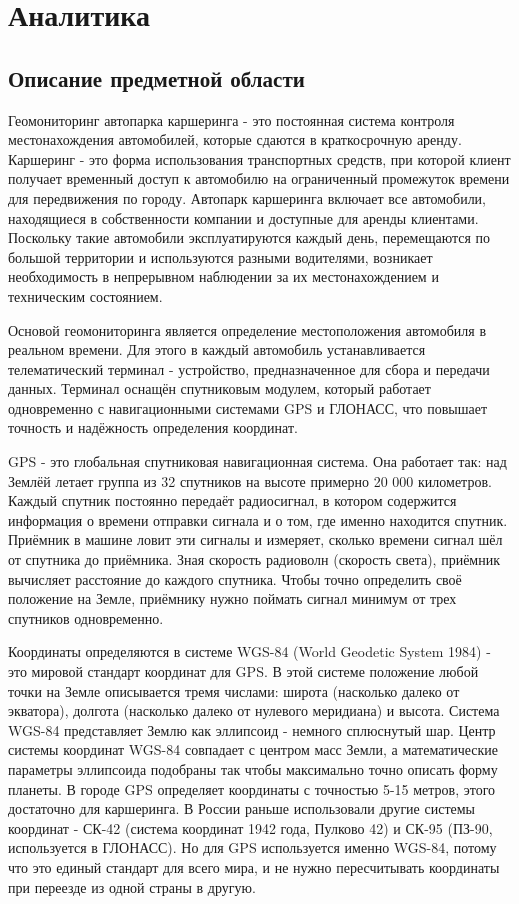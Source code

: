 \section{Аналитика}

\subsection{Описание предметной области}

Геомониторинг автопарка каршеринга - это постоянная система контроля местонахождения автомобилей, которые сдаются в краткосрочную аренду. Каршеринг - это форма использования транспортных средств, при которой клиент получает временный доступ к автомобилю на ограниченный промежуток времени для передвижения по городу. Автопарк каршеринга включает все автомобили, находящиеся в собственности компании и доступные для аренды клиентами. Поскольку такие автомобили эксплуатируются каждый день, перемещаются по большой территории и используются разными водителями, возникает необходимость в непрерывном наблюдении за их местонахождением и техническим состоянием.

Основой геомониторинга является определение местоположения автомобиля в реальном времени. Для этого в каждый автомобиль устанавливается телематический терминал - устройство, предназначенное для сбора и передачи данных. Терминал оснащён спутниковым модулем, который работает одновременно с навигационными системами GPS и ГЛОНАСС, что повышает точность и надёжность определения координат.

GPS - это глобальная спутниковая навигационная система. Она работает так: над Землёй летает группа из 32 спутников на высоте примерно 20 000 километров. Каждый спутник постоянно передаёт радиосигнал, в котором содержится информация о времени отправки сигнала и о том, где именно находится спутник. Приёмник в машине ловит эти сигналы и измеряет, сколько времени сигнал шёл от спутника до приёмника. Зная скорость радиоволн (скорость света), приёмник вычисляет расстояние до каждого спутника. Чтобы точно определить своё положение на Земле, приёмнику нужно поймать сигнал минимум от трех спутников одновременно.

Координаты определяются в системе WGS-84 (World Geodetic System 1984) - это мировой стандарт координат для GPS. В этой системе положение любой точки на Земле описывается тремя числами: широта (насколько далеко от экватора), долгота (насколько далеко от нулевого меридиана) и высота. Система WGS-84 представляет Землю как эллипсоид - немного сплюснутый шар. Центр системы координат WGS-84 совпадает с центром масс Земли, а математические параметры эллипсоида подобраны так чтобы максимально точно описать форму планеты. В городе GPS определяет координаты с точностью 5-15 метров, этого достаточно для каршеринга. В России раньше использовали другие системы координат - СК-42 (система координат 1942 года, Пулково 42) и СК-95 (ПЗ-90, используется в ГЛОНАСС). Но для GPS используется именно WGS-84, потому что это единый стандарт для всего мира, и не нужно пересчитывать координаты при переезде из одной страны в другую.

